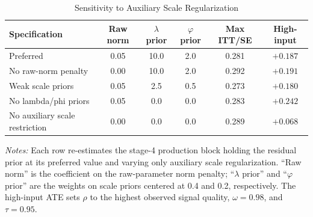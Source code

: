 \begin{table}[H]
\centering
\caption{Sensitivity to Auxiliary Scale Regularization}
\label{tab:struct_regularization_sensitivity}
\begin{threeparttable}
\footnotesize
\begin{tabular}[t]{lccccc}
\toprule
Specification & Raw norm & $\lambda$ prior & $\varphi$ prior & Max ITT/SE & High-input \\
\midrule
Preferred & 0.05 & 10.0 & 2.0 & 0.281 & $+0.187$ \\
No raw-norm penalty & 0.00 & 10.0 & 2.0 & 0.292 & $+0.191$ \\
Weak scale priors & 0.05 & 2.5 & 0.5 & 0.273 & $+0.180$ \\
No lambda/phi priors & 0.05 & 0.0 & 0.0 & 0.283 & $+0.242$ \\
No auxiliary scale restriction & 0.00 & 0.0 & 0.0 & 0.289 & $+0.068$ \\
\bottomrule
\end{tabular}
\begin{tablenotes}
\footnotesize
\item \textit{Notes:} Each row re-estimates the stage-4 production block holding the residual prior at its preferred value and varying only auxiliary scale regularization. ``Raw norm'' is the coefficient on the raw-parameter norm penalty; ``$\lambda$ prior'' and ``$\varphi$ prior'' are the weights on scale priors centered at 0.4 and 0.2, respectively. The high-input ATE sets $\rho$ to the highest observed signal quality, $\omega=0.98$, and $\tau=0.95$.
\end{tablenotes}
\end{threeparttable}
\end{table}
